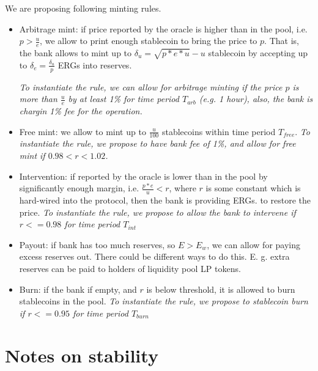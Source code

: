 \documentclass{article}   %
\newcommand{\bc}{ERG}
\newcommand{\sct}{stablecoin}
\begin{document}
We are proposing following minting rules.  

\begin{itemize}
  \item{Arbitrage mint: } if price reported by the oracle is higher than in the pool, i.e. $p > \frac{u}{e}$, we allow to print enough \sct{} to bring the price to $p$. That is, the bank allows to mint up to $\delta_u = \sqrt{p*e*u}-u$ \sct{} by accepting up to $\delta_e = \frac{\delta_u}{p}$ \bc{}s into reserves. 

  \em{To instantiate the rule, we can allow for arbitrage minting if the price $p$ is more than $\frac{u}{e}$ by at least 1\% for time period $T_{arb}$ (e.g. 1 hour), also, the bank is chargin 1\% fee 
  for the operation.} 

  \item{Free mint: } we allow to mint up to $\frac{u}{100}$ \sct{}s within time period $T_{free}$. 
  \em{To instantiate the rule, we propose to have bank fee of 1\%, and allow for free mint if $0.98 < r < 1.02$}.
\end{itemize}  


\begin{itemize}
   \item{Intervention: } if reported by the oracle is lower than in the pool by significantly enough margin, i.e. $\frac{p*e}{u} < r$, where $r$ is some constant which is hard-wired into the protocol, then the bank is providing \bc{}s. to restore the price.
   \em{To instantiate the rule, we propose to allow the bank to intervene if $r <= 0.98$ for time period $T_{int}$}
   \item{Payout: } if bank has too much reserves, so $E > E_w$, we can allow for paying excess reserves out. There could be different ways to do this. E. g. extra reserves can be paid to holders of
   liquidity pool LP tokens.
\end{itemize}

\begin{itemize}
   \item{Burn: } if the bank if empty, and $r$ is below threshold, it is allowed to burn \sct{}s in the pool. 
   \em{To instantiate the rule, we propose to \sct{} burn if $r <= 0.95$ for time period $T_{burn}$}
\end{itemize}

\section{Notes on stability}
 
\end{document}
